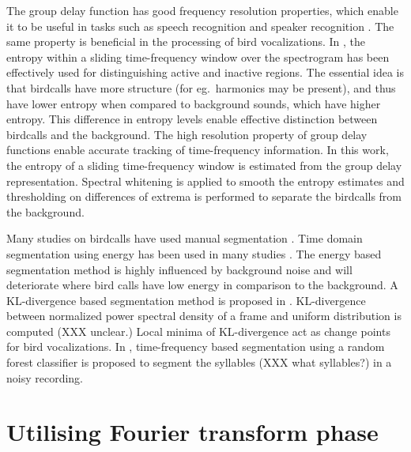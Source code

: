 \documentclass[a4paper]{article}
\begin{document}
The group delay function has good frequency resolution properties, which enable
it to be useful in tasks such as speech recognition and speaker recognition
\cite{hema} \cite{padman} \cite{modgdf}. The same property is beneficial in the
processing of bird vocalizations. In \cite{wang2013}, the entropy within a
sliding time-frequency window over the spectrogram has been effectively used for
distinguishing active and inactive regions. The essential idea is that birdcalls
have more structure (for eg.~harmonics may be present), and thus have lower
entropy when compared to background sounds, which have higher entropy. This
difference in entropy levels enable effective distinction between birdcalls and
the background.
The high resolution property of group delay functions enable accurate tracking
of time-frequency information. In this work, the entropy of a sliding
time-frequency window is estimated from the group delay representation. Spectral
whitening is applied to smooth the entropy estimates and thresholding on
differences of extrema is performed to separate the birdcalls from the
background.

Many studies on birdcalls have used manual segmentation \cite{Trifa} \cite{Lee}
\cite{Kaewtip}. Time domain segmentation using energy has been used in many
studies \cite{Harma} \cite{Somervuo} \cite{Fagerlund} . The energy  based
segmentation method is highly influenced by background noise and will
deteriorate  where bird calls have low energy in comparison to the background. A
KL-divergence based segmentation method is proposed in \cite{Lakshmi}.
KL-divergence between normalized power spectral density of a frame and uniform
distribution is computed (XXX unclear.) Local minima of KL-divergence act as
change points for bird vocalizations. In \cite{Neal}, time-frequency based
segmentation using a random forest classifier is proposed to segment the
syllables (XXX what syllables?) in a noisy recording. 





\section{Utilising Fourier transform phase}
\end{document}
